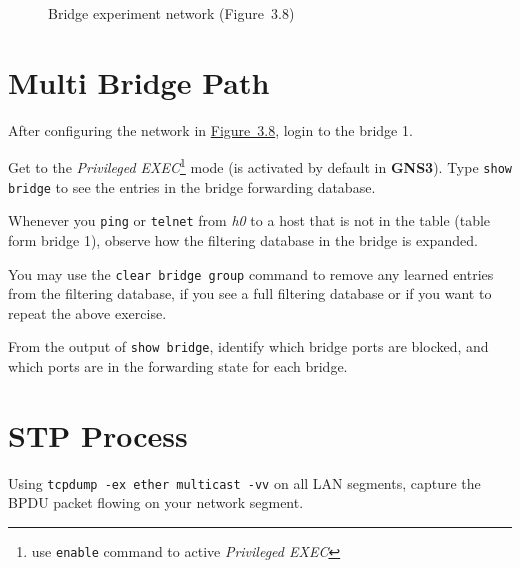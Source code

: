 \documentclass{../UTNetLab}
\begin{document}
\begin{figure}[H]
        \caption{Bridge experiment network (Figure~3.8)}\label{fig:3.8}
    \end{figure}

\section{Multi Bridge Path}
    After configuring the network in \hyperref[fig:3.8]{Figure~3.8}, login to the bridge 1.

    Get to the \textit{Privileged EXEC}\footnote{use \lstinline[language=cisco]{enable} command to active \textit{Privileged EXEC}} mode (is activated by default in \textbf{GNS3}).
    Type \lstinline[language={cisco}]{show bridge} to see the entries in the bridge forwarding database.

    Whenever you \lstinline{ping} or \lstinline{telnet} from \textit{h0} to a host that is not in the table (table form bridge 1), observe how the filtering database in the bridge is expanded.

    You may use the \lstinline[language={cisco}, emph={group}]{clear bridge group} command to remove any learned entries from the filtering database, if you see a full filtering database or if you want to repeat the above exercise.

    \begin{report}
        \item From the output of \lstinline[language={cisco}]{show bridge}, identify which bridge ports are blocked, and which ports are in the forwarding state for each bridge.
    \end{report}

\section{STP Process}
    Using \lstinline{tcpdump -ex ether multicast -vv} on all LAN segments, capture the BPDU packet flowing on your network segment.
\end{document}
